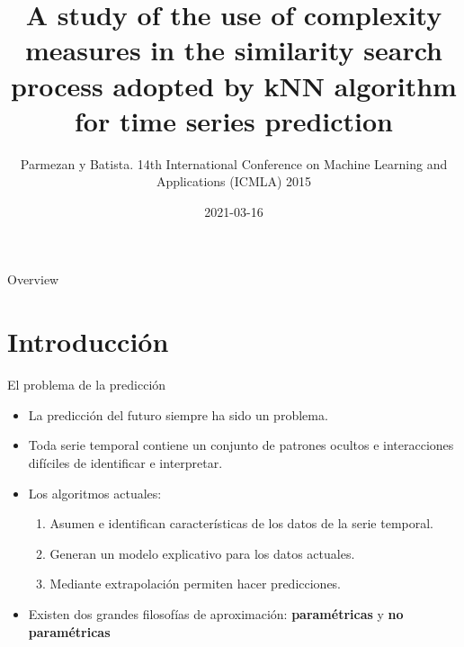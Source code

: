 \documentclass[12pt, aspectratio=169]{beamer} %
\title{A study of the use of complexity measures in the similarity search process adopted by kNN algorithm for time series prediction}
\author{Parmezan y Batista. 14th International Conference on Machine Learning and Applications (ICMLA) 2015}
\date{2021-03-16}
\begin{document}
\frame{\titlepage}


\begin{frame}{Overview}
\tableofcontents
\end{frame}

\section{Introducción}

\begin{frame}{El problema de la predicción}
  \begin{itemize}
  \item La predicción del futuro siempre ha sido un problema.
  \item Toda serie temporal contiene un conjunto de patrones ocultos e interacciones difíciles de identificar e interpretar.
  \item Los algoritmos actuales:
    \begin{enumerate}
    \item Asumen e identifican características de los datos de la serie temporal.
    \item Generan un modelo explicativo para los datos actuales.
    \item Mediante extrapolación permiten hacer predicciones.
    \end{enumerate}
  \item Existen dos grandes filosofías de aproximación: \textbf{paramétricas} y \textbf{no paramétricas}
  \end{itemize}
\end{frame}
\end{document}
